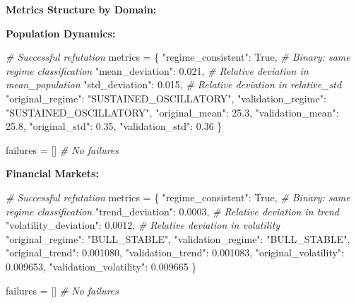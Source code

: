 \documentclass[
]{article}
\newenvironment{Shaded}{}{}
\newcommand{\CommentTok}[1]{\textcolor[rgb]{0.38,0.63,0.69}{\textit{#1}}}
\newcommand{\FloatTok}[1]{\textcolor[rgb]{0.25,0.63,0.44}{#1}}
\newcommand{\NormalTok}[1]{#1}
\newcommand{\OperatorTok}[1]{\textcolor[rgb]{0.40,0.40,0.40}{#1}}
\newcommand{\StringTok}[1]{\textcolor[rgb]{0.25,0.44,0.63}{#1}}
\newcommand{\VariableTok}[1]{\textcolor[rgb]{0.10,0.09,0.49}{#1}}
\begin{document}
\textbf{Metrics Structure by Domain:}

\textbf{Population Dynamics:}

\begin{Shaded}
\begin{Highlighting}[]
\CommentTok{\# Successful refutation}
\NormalTok{metrics }\OperatorTok{=}\NormalTok{ \{}
    \StringTok{"regime\_consistent"}\NormalTok{: }\VariableTok{True}\NormalTok{,             }\CommentTok{\# Binary: same regime classification}
    \StringTok{"mean\_deviation"}\NormalTok{: }\FloatTok{0.021}\NormalTok{,               }\CommentTok{\# Relative deviation in mean\_population}
    \StringTok{"std\_deviation"}\NormalTok{: }\FloatTok{0.015}\NormalTok{,                }\CommentTok{\# Relative deviation in relative\_std}
    \StringTok{"original\_regime"}\NormalTok{: }\StringTok{"SUSTAINED\_OSCILLATORY"}\NormalTok{,}
    \StringTok{"validation\_regime"}\NormalTok{: }\StringTok{"SUSTAINED\_OSCILLATORY"}\NormalTok{,}
    \StringTok{"original\_mean"}\NormalTok{: }\FloatTok{25.3}\NormalTok{,}
    \StringTok{"validation\_mean"}\NormalTok{: }\FloatTok{25.8}\NormalTok{,}
    \StringTok{"original\_std"}\NormalTok{: }\FloatTok{0.35}\NormalTok{,}
    \StringTok{"validation\_std"}\NormalTok{: }\FloatTok{0.36}
\NormalTok{\}}

\NormalTok{failures }\OperatorTok{=}\NormalTok{ []  }\CommentTok{\# No failures}
\end{Highlighting}
\end{Shaded}

\textbf{Financial Markets:}

\begin{Shaded}
\begin{Highlighting}[]
\CommentTok{\# Successful refutation}
\NormalTok{metrics }\OperatorTok{=}\NormalTok{ \{}
    \StringTok{"regime\_consistent"}\NormalTok{: }\VariableTok{True}\NormalTok{,             }\CommentTok{\# Binary: same regime classification}
    \StringTok{"trend\_deviation"}\NormalTok{: }\FloatTok{0.0003}\NormalTok{,             }\CommentTok{\# Relative deviation in trend}
    \StringTok{"volatility\_deviation"}\NormalTok{: }\FloatTok{0.0012}\NormalTok{,        }\CommentTok{\# Relative deviation in volatility}
    \StringTok{"original\_regime"}\NormalTok{: }\StringTok{"BULL\_STABLE"}\NormalTok{,}
    \StringTok{"validation\_regime"}\NormalTok{: }\StringTok{"BULL\_STABLE"}\NormalTok{,}
    \StringTok{"original\_trend"}\NormalTok{: }\FloatTok{0.001080}\NormalTok{,}
    \StringTok{"validation\_trend"}\NormalTok{: }\FloatTok{0.001083}\NormalTok{,}
    \StringTok{"original\_volatility"}\NormalTok{: }\FloatTok{0.009653}\NormalTok{,}
    \StringTok{"validation\_volatility"}\NormalTok{: }\FloatTok{0.009665}
\NormalTok{\}}

\NormalTok{failures }\OperatorTok{=}\NormalTok{ []  }\CommentTok{\# No failures}
\end{Highlighting}
\end{Shaded}
\end{document}
